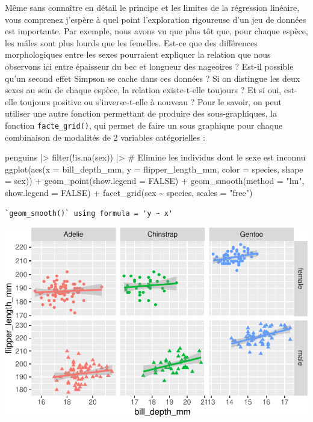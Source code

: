 \documentclass[
  a4paper,
  DIV=11,
  numbers=noendperiod,
  oneside]{scrreprt}
\newenvironment{Shaded}{}{}
\newcommand{\AttributeTok}[1]{\textcolor[rgb]{0.84,0.23,0.29}{#1}}
\newcommand{\CommentTok}[1]{\textcolor[rgb]{0.42,0.45,0.49}{#1}}
\newcommand{\ConstantTok}[1]{\textcolor[rgb]{0.00,0.36,0.77}{#1}}
\newcommand{\FunctionTok}[1]{\textcolor[rgb]{0.44,0.26,0.76}{#1}}
\newcommand{\NormalTok}[1]{\textcolor[rgb]{0.14,0.16,0.18}{#1}}
\newcommand{\SpecialCharTok}[1]{\textcolor[rgb]{0.00,0.36,0.77}{#1}}
\newcommand{\StringTok}[1]{\textcolor[rgb]{0.01,0.18,0.38}{#1}}
\begin{document}
Même sans connaître en détail le principe et les limites de la
régression linéaire, vous comprenez j'espère à quel point l'exploration
rigoureuse d'un jeu de données est importante. Par exemple, nous avons
vu que plus tôt que, pour chaque espèce, les mâles sont plus lourds que
les femelles. Est-ce que des différences morphologiques entre les sexes
pourraient expliquer la relation que nous observons ici entre épaisseur
du bec et longueur des nageoires ? Est-il possible qu'un second effet
Simpson se cache dans ces données ? Si on distingue les deux sexes au
sein de chaque espèce, la relation existe-t-elle toujours ? Et si oui,
est-elle toujours positive ou s'inverse-t-elle à nouveau ? Pour le
savoir, on peut utiliser une autre fonction permettant de produire des
sous-graphiques, la fonction \texttt{facte\_grid()}, qui permet de faire
un sous graphique pour chaque combinaison de modalités de 2 variables
catégorielles :

\begin{Shaded}
\begin{Highlighting}[]
\NormalTok{penguins }\SpecialCharTok{|\textgreater{}} 
  \FunctionTok{filter}\NormalTok{(}\SpecialCharTok{!}\FunctionTok{is.na}\NormalTok{(sex)) }\SpecialCharTok{|\textgreater{}}    \CommentTok{\# Elimine les individus dont le sexe est inconnu}
  \FunctionTok{ggplot}\NormalTok{(}\FunctionTok{aes}\NormalTok{(}\AttributeTok{x =}\NormalTok{ bill\_depth\_mm, }\AttributeTok{y =}\NormalTok{ flipper\_length\_mm,}
                     \AttributeTok{color =}\NormalTok{ species, }\AttributeTok{shape =}\NormalTok{ sex)) }\SpecialCharTok{+}
  \FunctionTok{geom\_point}\NormalTok{(}\AttributeTok{show.legend =} \ConstantTok{FALSE}\NormalTok{) }\SpecialCharTok{+}
  \FunctionTok{geom\_smooth}\NormalTok{(}\AttributeTok{method =} \StringTok{"lm"}\NormalTok{, }\AttributeTok{show.legend =} \ConstantTok{FALSE}\NormalTok{) }\SpecialCharTok{+}
  \FunctionTok{facet\_grid}\NormalTok{(sex }\SpecialCharTok{\textasciitilde{}}\NormalTok{ species, }\AttributeTok{scales =} \StringTok{"free"}\NormalTok{)}
\end{Highlighting}
\end{Shaded}

\begin{verbatim}
`geom_smooth()` using formula = 'y ~ x'
\end{verbatim}

\includegraphics{03-visualization_files/figure-pdf/unnamed-chunk-85-1.pdf}
\end{document}

